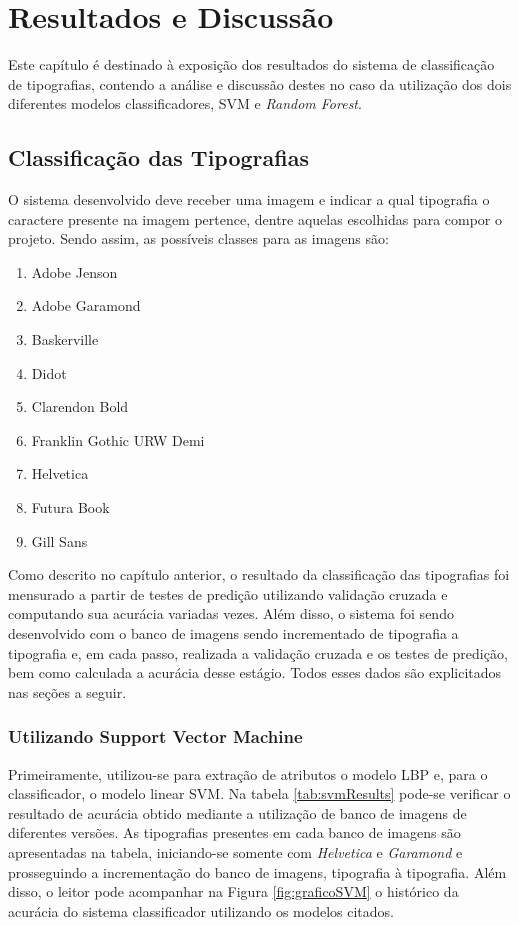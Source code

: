 \chapter{Resultados e Discussão}

Este capítulo é destinado à exposição dos resultados do sistema de classificação de tipografias, contendo a análise e discussão destes no caso da utilização dos dois diferentes modelos classificadores, SVM e \textit{Random Forest}.

\section{Classificação das Tipografias}

O sistema desenvolvido deve receber uma imagem e indicar a qual tipografia o caractere presente na imagem pertence, dentre aquelas escolhidas para compor o projeto. Sendo assim, as possíveis classes para as imagens são:

\begin{enumerate}
\item Adobe Jenson
\item Adobe Garamond
\item Baskerville
\item Didot
\item Clarendon Bold
\item Franklin Gothic URW Demi
\item Helvetica
\item Futura Book
\item Gill Sans
\end{enumerate}

Como descrito no capítulo anterior, o resultado da classificação das tipografias foi mensurado a partir de testes de predição utilizando validação cruzada e computando sua acurácia variadas vezes. Além disso, o sistema foi sendo desenvolvido com o banco de imagens sendo incrementado de tipografia a tipografia e, em cada passo, realizada a validação cruzada e os testes de predição, bem como calculada a acurácia desse estágio. Todos esses dados são explicitados nas seções a seguir.

\subsection{Utilizando Support Vector Machine}

Primeiramente, utilizou-se para extração de atributos o modelo LBP e, para o classificador, o modelo linear SVM. Na tabela \ref{tab:svmResults} pode-se verificar o resultado de acurácia obtido mediante a utilização de banco de imagens de diferentes versões. As tipografias presentes em cada banco de imagens são apresentadas na tabela, iniciando-se somente com \textit{Helvetica} e \textit{Garamond} e prosseguindo a incrementação do banco de imagens, tipografia à tipografia. Além disso, o leitor pode acompanhar na Figura \ref{fig:graficoSVM} o histórico da acurácia do sistema classificador utilizando os modelos citados.

